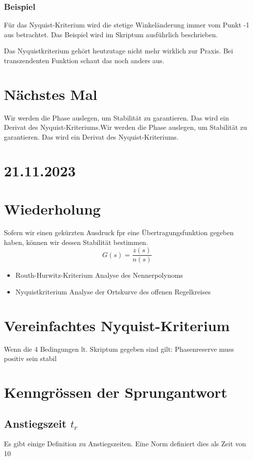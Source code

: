 \documentclass[a4paper]{article}
\begin{document}
\subsubsection*{Beispiel}
 Für das Nyquist-Kriterium wird die stetige Winkeländerung immer vom Punkt -1 aus betrachtet. Das Beispiel wird im Skriptum ausführlich beschrieben.

 Das Nyquistkriterium gehört heutzutage nicht mehr wirklich zur Praxis. Bei transzendenten Funktion schaut das noch anders aus.

 \section*{Nächstes Mal}
 Wir werden die Phase auslegen, um Stabilität zu garantieren. Das wird ein Derivat des Nyquist-Kriteriums.Wir werden die Phase auslegen, um Stabilität zu garantieren. Das wird ein Derivat des Nyquist-Kriteriums.

 \section*{21.11.2023}
 \section*{Wiederholung}
 Sofern wir einen gekürzten Ausdruck fpr eine Übertragungsfunktion gegeben haben, können wir dessen Stabilität bestimmen.
 \[ G(s)=\frac{z(s)}{n(s)} \]
 \begin{itemize}
     \item Routh-Hurwitz-Kriterium
         Analyse des Nennerpolynoms
     \item Nyquistkriterium
         Analyse der Ortskurve des offenen Regelkreises
 \end{itemize}
 
 \section*{Vereinfachtes Nyquist-Kriterium}
Wenn die 4 Bedingungen lt. Skriptum gegeben sind gilt: Phasenreserve muss positiv sein \implies stabil

\section*{Kenngrössen der Sprungantwort}
\subsection*{Anstiegszeit $t_{r}$}
Es gibt einige Definition zu Anstiegszeiten. Eine Norm definiert dies als Zeit von 10%
\end{document}
